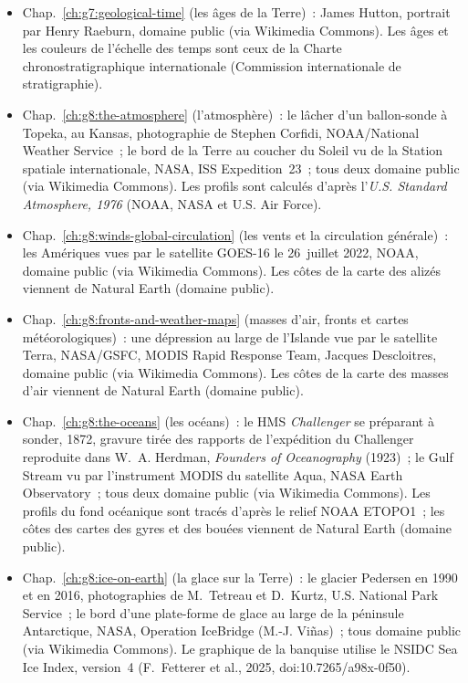 \begin{itemize}
  \item Chap.~\ref{ch:g7:geological-time} (les âges de la Terre)~: James Hutton, portrait par Henry Raeburn, domaine public (via Wikimedia Commons). Les âges et les couleurs de l'échelle des temps sont ceux de la Charte chronostratigraphique internationale (Commission internationale de stratigraphie).
  \item Chap.~\ref{ch:g8:the-atmosphere} (l'atmosphère)~: le lâcher d'un ballon-sonde à Topeka, au Kansas, photographie de Stephen Corfidi, NOAA/National Weather Service~; le bord de la Terre au coucher du Soleil vu de la Station spatiale internationale, NASA, ISS Expedition~23~; tous deux domaine public (via Wikimedia Commons). Les profils sont calculés d'après l'\emph{U.S. Standard Atmosphere, 1976} (NOAA, NASA et U.S. Air Force).
  \item Chap.~\ref{ch:g8:winds-global-circulation} (les vents et la circulation générale)~: les Amériques vues par le satellite GOES-16 le 26~juillet 2022, NOAA, domaine public (via Wikimedia Commons). Les côtes de la carte des alizés viennent de Natural Earth (domaine public).
  \item Chap.~\ref{ch:g8:fronts-and-weather-maps} (masses d'air, fronts et cartes météorologiques)~: une dépression au large de l'Islande vue par le satellite Terra, NASA/GSFC, MODIS Rapid Response Team, Jacques Descloitres, domaine public (via Wikimedia Commons). Les côtes de la carte des masses d'air viennent de Natural Earth (domaine public).
  \item Chap.~\ref{ch:g8:the-oceans} (les océans)~: le HMS \emph{Challenger} se préparant à sonder, 1872, gravure tirée des rapports de l'expédition du Challenger reproduite dans W.~A. Herdman, \emph{Founders of Oceanography} (1923)~; le Gulf Stream vu par l'instrument MODIS du satellite Aqua, NASA Earth Observatory~; tous deux domaine public (via Wikimedia Commons). Les profils du fond océanique sont tracés d'après le relief NOAA ETOPO1~; les côtes des cartes des gyres et des bouées viennent de Natural Earth (domaine public).
  \item Chap.~\ref{ch:g8:ice-on-earth} (la glace sur la Terre)~: le glacier Pedersen en 1990 et en 2016, photographies de M.~Tetreau et D.~Kurtz, U.S. National Park Service~; le bord d'une plate-forme de glace au large de la péninsule Antarctique, NASA, Operation IceBridge (M.-J. Viñas)~; tous domaine public (via Wikimedia Commons). Le graphique de la banquise utilise le NSIDC Sea Ice Index, version~4 (F.~Fetterer et al., 2025, doi:10.7265/a98x-0f50).

\end{itemize}
